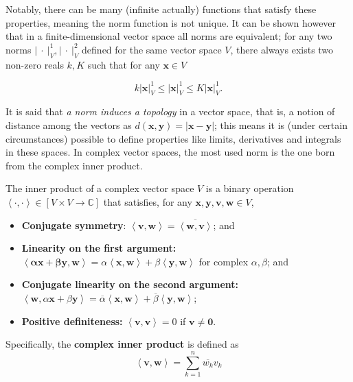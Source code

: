 	Notably, there can be many (infinite actually) functions that satisfy these properties, meaning the norm function is not unique. It can be shown however  that in a finite-dimensional vector space all norms are equivalent; for any two norms $\left\lvert\ \cdot\ \right\rvert^1_V, \left\lvert\ \cdot\ \right\rvert^2_V $ defined for the same vector space $V$, there always exists two non-zero reals $k,K$ such that for any $\mathbf{x}\in V$

\begin{equation} k\left\lvert\mathbf{x}\right\rvert^1_V \leq \left\lvert\mathbf{x}\right\rvert^1_V \leq K\left\lvert\mathbf{x}\right\rvert^1_V .\end{equation}

	It is said that \textit{a norm induces a topology} in a vector space, that is, a notion of distance among the vectors as $d\left(\mathbf{x},\mathbf{y}\right) = \left\lvert \mathbf{x - y}\right\rvert$; this means it is (under certain circumstances) possible to define properties like limits, derivatives and integrals in these spaces. In complex vector spaces, the most used norm is the one born from the complex inner product.

\begin{definition}\label{def:complex_inner_prod} The inner product of a complex vector space $V$ is a binary operation $\left<\cdot,\cdot\right>\in\left[ V\times V\to \mathbb{C}\right]$ that satisfies, for any $\mathbf{x,y,v,w}\in V$,

\begin{itemize}
	\item \textbf{Conjugate symmetry}: $\left<\mathbf{v,w}\right> = \overline{\left<\mathbf{w,v}\right>}$; and
	\item \textbf{Linearity on the first argument:} $\left<\mathbf{\alpha x + \beta y,\mathbf{w}}\right> = \alpha\left<\mathbf{x,w}\right> + \beta\left<\mathbf{y,w}\right>$ for complex $\alpha,\beta$; and
	\item \textbf{Conjugate linearity on the second argument:} $\left<\mathbf{w},\alpha \mathbf{x} + \beta \mathbf{y}\right> = \overline{\alpha}\left<\mathbf{x,w}\right> + \overline{\beta}\left<\mathbf{y,w}\right>$;
	\item \textbf{Positive definiteness:} $\left<\mathbf{v,v}\right> = 0$ if $\mathbf{v}\neq \mathbf{0}$.
\end{itemize}

	Specifically, the \textbf{complex inner product} is defined as
\begin{equation} \left<\mathbf{v,w}\right> = \sum_{k=1}^n \overline{w_k}v_k\end{equation}
\end{definition}

